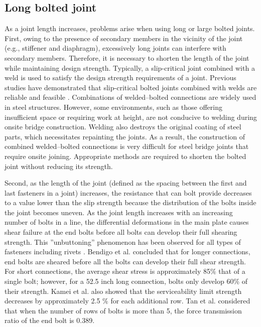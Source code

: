 \subsection{Long bolted joint}
As a joint length increases, problems arise when using  long or large bolted joints. First, owing to the presence of secondary members in the vicinity of the joint (e.g., stiffener and diaphragm), excessively long joints can interfere with secondary members. Therefore, it is necessary to shorten the length of the joint while maintaining design strength. Typically, a slip-critical joint combined with a weld is used to satisfy the design strength requirements of a joint. Previous studies have demonstrated that slip-critical bolted joints combined with welds are reliable and feasible \cite{solodov2021,Thomas2000,Chang2019361,KHANDEL2022107036}. Combinations of welded--bolted connections are widely used in steel structures. However, some environments, such as those offering insufficient space or requiring work at height, are not conducive to welding during onsite bridge construction. Welding also destroys the original coating of steel parts, which necessitates repainting the joints. As a result, the construction of combined welded--bolted connections is very difficult for steel bridge joints that require onsite joining. Appropriate methods are required to shorten the bolted joint without reducing its strength. \par

Second, as the length of the joint (defined as the spacing between the first and last fasteners in a joint) increases, the resistance that can bolt provide decreases to a value lower than the slip strength because the distribution of the bolts inside the joint becomes uneven. As the joint length increases with an increasing number of bolts in a line, the differential deformations in the main plate causes shear failure at the end bolts before all bolts can develop their full shearing strength. This ''unbuttoning'' phenomenon has been observed for all types of fasteners including rivets \cite{fisher1965behavior}. Bendigo et al.\cite{bendigo1963long} concluded that for longer connections, end bolts are sheared before all the bolts can develop their full shear strength. For short connections, the average shear stress is approximately 85\% that of a single bolt; however, for a 52.5 inch long connection, bolts only develop 60\% of their strength. Kamei et al. \cite{KAMEI2000} also showed that the serviceability limit strength decreases by approximately 2.5 $\%$ for each additional row.  Tan et al.\cite{Tan2022} considered that when the number of rows of bolts is more than 5, the force transmission ratio of the end bolt is 0.389.

